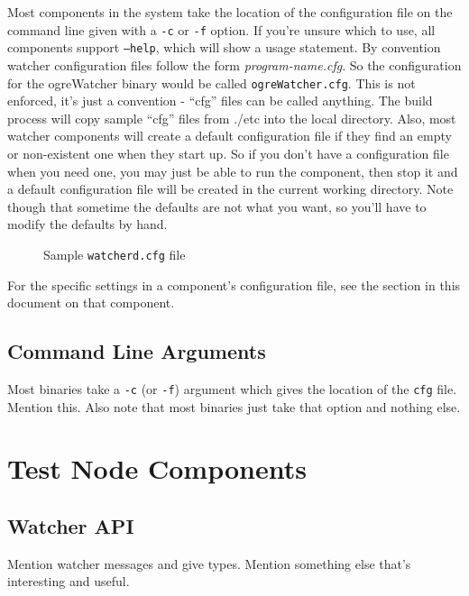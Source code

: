 \documentclass{article}
\begin{document}
Most components in the system take the location of the configuration file on the command line given with a {\tt -c} or {\tt -f} option. If you're unsure
which to use, all components support {\tt --help}, which will show a usage statement. By convention watcher configuration files follow the form {\it program-name.cfg}. 
So the configuration for the ogreWatcher binary would be called {\tt ogreWatcher.cfg}. This is not enforced, it's just a convention - ``cfg'' files can be called anything. 
The build process will copy sample ``cfg'' files from .\slash etc into the local directory. Also, most watcher components will create a default configuration file
if they find an empty or non-existent one when they start up. So if you don't have a configuration file when you need one, you may just be able to run the component, then stop it and 
a default configuration file will be created in the current working directory.  Note though that sometime the defaults are not what you want, so you'll have to modify the defaults by hand.

\begin{figure}[htb]
\caption{Sample {\tt watcherd.cfg} file}
\label{fig:watcherdCfg}
\end{figure}

For the specific settings in a component's configuration file, see the section in this document on that component. 

\subsection{Command Line Arguments}
Most binaries take a {\tt -c} (or {\tt -f}) argument which gives the location of the {\tt cfg} file. Mention this. Also note that most binaries 
just take that option and nothing else. 

\section{Test Node Components}
\subsection{Watcher API}
Mention watcher messages and give types. Mention something else that's interesting and useful. 
\end{document}
